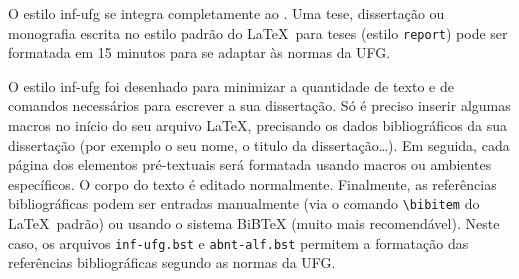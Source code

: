 O estilo \textsf{inf-ufg} se integra completamente ao \LaTeXe. Uma tese, dissertação ou monografia escrita no estilo padrão do \LaTeX\ para teses (estilo \verb|report|) pode ser formatada em 15 minutos para se adaptar às normas da UFG.

O estilo \textsf{inf-ufg} foi desenhado para minimizar a quantidade de texto e de comandos necessários para escrever a sua dissertação. Só é preciso inserir algumas macros no início do seu arquivo \LaTeX, precisando os dados bibliográficos da sua dissertação (por exemplo o seu nome, o titulo da dissertação\ldots). Em seguida, cada página dos elementos pré-textuais será formatada usando macros ou ambientes específicos. O corpo do texto é editado normalmente. Finalmente, as referências bibliográficas podem ser entradas manualmente (via o comando \verb|\bibitem| do \LaTeX\ padrão) ou usando o sistema BiBTeX (muito mais recomendável). Neste caso, os arquivos \verb|inf-ufg.bst| e \verb|abnt-alf.bst| permitem a formatação das referências bibliográficas segundo as normas da UFG.